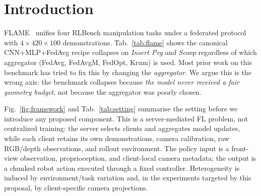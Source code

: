 \documentclass{article}
\begin{document}
\section{Introduction}
\label{sec:intro}

FLAME~\cite{flame2025} unifies four RLBench manipulation tasks under
a federated protocol with $4 \!\times\! 420 \!\times\! 100$ demonstrations.
Tab.~\ref{tab:flame} shows the canonical CNN+MLP+FedAvg
\cite{fedavg} recipe
collapses on \emph{Insert Peg} and \emph{Scoop} regardless of which
aggregator (FedAvg, FedAvgM, FedOpt, Krum) is used. Most prior work
on this benchmark has tried to fix this by changing the
\emph{aggregator}. We argue this is the wrong axis: the benchmark
collapses because \emph{the model never received a fair geometry
budget}, not because the aggregator was poorly chosen.

Fig.~\ref{fig:framework} and Tab.~\ref{tab:setting} summarise the
setting before we introduce any proposed component. This is a
server-mediated FL problem, not centralized training: the server
selects clients and aggregates model updates, while each client
retains its own demonstrations, camera calibration, raw RGB/depth
observations, and rollout environment. The policy input is a
front-view observation, proprioception, and client-local camera
metadata; the output is a chunked robot action executed through a
fixed controller. Heterogeneity is induced by environment/task
variation and, in the experiments targeted by this proposal, by
client-specific camera projections.
\end{document}
